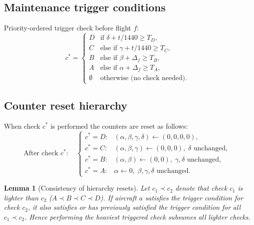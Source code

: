 \documentclass[11pt, a4paper]{article}
\theoremstyle{plain}
\newtheorem{lemma}{Lemma}
\theoremstyle{definition}
\theoremstyle{remark}
\begin{document}
\subsection{Maintenance trigger conditions}
\label{eq:trigger}

Priority-ordered trigger check before flight $f$:
\begin{equation}\label{eq:trigger}
  c^* =
  \begin{cases}
    D & \text{if } \delta + t/1440 \ge T_D, \\
    C & \text{else if } \gamma + t/1440 \ge T_C, \\
    B & \text{else if } \beta + \Delta_f \ge T_B, \\
    A & \text{else if } \alpha + \Delta_f \ge T_A, \\
    \emptyset & \text{otherwise (no check needed)}.
  \end{cases}
\end{equation}

\subsection{Counter reset hierarchy}
\label{eq:reset}

When check $c^*$ is performed the counters are reset as follows:
\begin{equation}\label{eq:reset}
  \text{After check } c^*:\quad
  \begin{cases}
    c^* = D: & (\alpha,\beta,\gamma,\delta) \leftarrow (0,0,0,0), \\
    c^* = C: & (\alpha,\beta,\gamma) \leftarrow (0,0,0),\;\delta \text{ unchanged}, \\
    c^* = B: & (\alpha,\beta) \leftarrow (0,0),\;\gamma,\delta \text{ unchanged}, \\
    c^* = A: & \alpha \leftarrow 0,\;\beta,\gamma,\delta \text{ unchanged}.
  \end{cases}
\end{equation}

\begin{lemma}[Consistency of hierarchy resets]
  Let $c_1 \prec c_2$ denote that check $c_1$ is lighter than $c_2$
  ($A \prec B \prec C \prec D$).  If aircraft $a$ satisfies the trigger
  condition for check $c_2$, it also satisfies or has previously satisfied the
  trigger condition for all $c_1 \prec c_2$.  Hence performing the heaviest
  triggered check subsumes all lighter checks.
\end{lemma}
\end{document}
